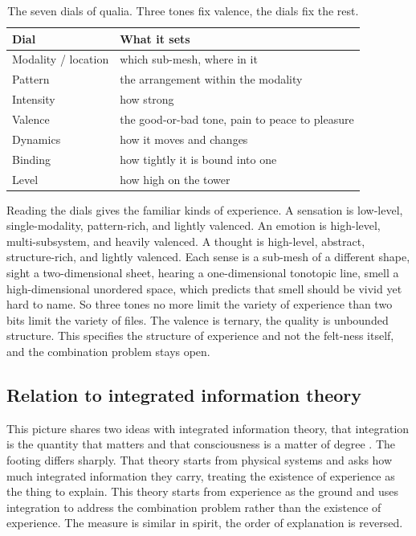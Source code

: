 \begin{table}[ht]
\centering
\begin{tabular}{ll}
\toprule
Dial & What it sets \\
\midrule
Modality / location & which sub-mesh, where in it \\
Pattern & the arrangement within the modality \\
Intensity & how strong \\
Valence & the good-or-bad tone, pain to peace to pleasure \\
Dynamics & how it moves and changes \\
Binding & how tightly it is bound into one \\
Level & how high on the tower \\
\bottomrule
\end{tabular}
\caption{The seven dials of qualia. Three tones fix valence, the dials fix the rest.}
\end{table}

Reading the dials gives the familiar kinds of experience. A sensation is low-level, single-modality,
pattern-rich, and lightly valenced. An emotion is high-level, multi-subsystem, and heavily valenced. A thought is
high-level, abstract, structure-rich, and lightly valenced. Each sense is a sub-mesh of a different shape, sight a
two-dimensional sheet, hearing a one-dimensional tonotopic line, smell a high-dimensional unordered space, which
predicts that smell should be vivid yet hard to name. So three tones no more limit the variety of experience than
two bits limit the variety of files. The valence is ternary, the quality is unbounded structure. This specifies
the structure of experience and not the felt-ness itself, and the combination problem stays open.

\subsection{Relation to integrated information theory}

This picture shares two ideas with integrated information theory, that integration is the quantity that matters
and that consciousness is a matter of degree \cite{tononi2004, hoel2013}. The footing differs sharply. That theory
starts from physical systems and asks how much integrated information they carry, treating the existence of
experience as the thing to explain. This theory starts from experience as the ground and uses integration to
address the combination problem rather than the existence of experience. The measure is similar in spirit, the
order of explanation is reversed.

